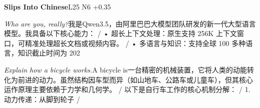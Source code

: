 \begin{multicols}{2}
\noindent\textbf{Slips Into Chinese}\hfill{\ttfamily L25 N6 +0.35}\par\noindent\textit{Who are you, really?}\enspace 我\allowbreak{}是\allowbreak{}Qwen3.5，\allowbreak{}\allowbreak{}由\allowbreak{}阿\allowbreak{}里\allowbreak{}巴\allowbreak{}巴\allowbreak{}大\allowbreak{}模\allowbreak{}型\allowbreak{}团\allowbreak{}队\allowbreak{}\allowbreak{}研\allowbreak{}发\allowbreak{}的\allowbreak{}新\allowbreak{}一\allowbreak{}代\allowbreak{}大\allowbreak{}型\allowbreak{}语\allowbreak{}言\allowbreak{}\allowbreak{}模\allowbreak{}型\allowbreak{}。\allowbreak{}我\allowbreak{}具\allowbreak{}备\allowbreak{}以\allowbreak{}下\allowbreak{}核\allowbreak{}心\allowbreak{}\allowbreak{}能\allowbreak{}力\allowbreak{}：\allowbreak{} / • 超\allowbreak{}长\allowbreak{}上\allowbreak{}下\allowbreak{}文\allowbreak{}处\allowbreak{}理\allowbreak{}：\allowbreak{}原\allowbreak{}生\allowbreak{}支\allowbreak{}持\allowbreak{} 256K 上\allowbreak{}下\allowbreak{}文\allowbreak{}窗\allowbreak{}口\allowbreak{}，\allowbreak{}可\allowbreak{}精\allowbreak{}准\allowbreak{}处\allowbreak{}理\allowbreak{}超\allowbreak{}长\allowbreak{}文\allowbreak{}档\allowbreak{}或\allowbreak{}视\allowbreak{}频\allowbreak{}内\allowbreak{}容\allowbreak{}。\allowbreak{} / • 多\allowbreak{}语\allowbreak{}言\allowbreak{}与\allowbreak{}知\allowbreak{}识\allowbreak{}：\allowbreak{}支\allowbreak{}持\allowbreak{}全\allowbreak{}球\allowbreak{} 100 多\allowbreak{}种\allowbreak{}语\allowbreak{}言\allowbreak{}，\allowbreak{}知\allowbreak{}识\allowbreak{}截\allowbreak{}止\allowbreak{}时\allowbreak{}间\allowbreak{}为\allowbreak{} 202\par\noindent\textit{Explain how a bicycle works.}\enspace A bicycle is一\allowbreak{}台\allowbreak{}精\allowbreak{}密\allowbreak{}的\allowbreak{}机\allowbreak{}械\allowbreak{}装\allowbreak{}\allowbreak{}置\allowbreak{}，\allowbreak{}它\allowbreak{}将\allowbreak{}人\allowbreak{}类\allowbreak{}的\allowbreak{}动\allowbreak{}能\allowbreak{}转\allowbreak{}\allowbreak{}化\allowbreak{}为\allowbreak{}前\allowbreak{}进\allowbreak{}的\allowbreak{}动\allowbreak{}力\allowbreak{}。\allowbreak{}虽\allowbreak{}然\allowbreak{}\allowbreak{}结\allowbreak{}构\allowbreak{}因\allowbreak{}车\allowbreak{}型\allowbreak{}而\allowbreak{}异\allowbreak{}（\allowbreak{}如\allowbreak{}山\allowbreak{}\allowbreak{}地\allowbreak{}车\allowbreak{}、\allowbreak{}公\allowbreak{}路\allowbreak{}车\allowbreak{}或\allowbreak{}儿\allowbreak{}童\allowbreak{}车\allowbreak{}\allowbreak{}）\allowbreak{}，\allowbreak{}但\allowbreak{}其\allowbreak{}核\allowbreak{}心\allowbreak{}运\allowbreak{}作\allowbreak{}原\allowbreak{}理\allowbreak{}\allowbreak{}主\allowbreak{}要\allowbreak{}依\allowbreak{}赖\allowbreak{}于\allowbreak{}力\allowbreak{}学\allowbreak{}和\allowbreak{}几\allowbreak{}何\allowbreak{}\allowbreak{}学\allowbreak{}。\allowbreak{} / 以\allowbreak{}下\allowbreak{}是\allowbreak{}自\allowbreak{}行\allowbreak{}车\allowbreak{}工\allowbreak{}作\allowbreak{}的\allowbreak{}核\allowbreak{}心\allowbreak{}机\allowbreak{}制\allowbreak{}分\allowbreak{}解\allowbreak{}：\allowbreak{} / 1. 动\allowbreak{}力\allowbreak{}传\allowbreak{}递\allowbreak{}：\allowbreak{}从\allowbreak{}脚\allowbreak{}到\allowbreak{}轮\allowbreak{}子\allowbreak{} / 
\end{multicols}

